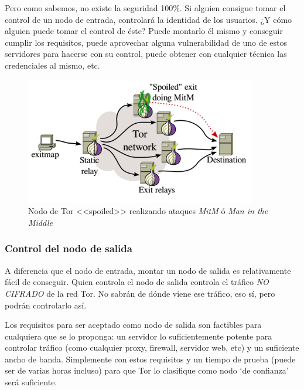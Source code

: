 \documentclass[a4paper, 11pt, titlepage]{article}
\begin{document}
        Pero como sabemos, no existe la seguridad 100\%. Si alguien consigue tomar el control de un nodo de entrada, 
        controlará la identidad de los usuarios. ¿Y cómo alguien puede tomar el control de éste? Puede montarlo él mismo 
        y conseguir cumplir los requisitos, puede aprovechar alguna vulnerabilidad de uno de estos servidores para hacerse 
        con su control, puede obtener con cualquier técnica las credenciales al mismo, etc.

        \begin{figure}[htp]
            \centering
            \includegraphics[width=0.9\textwidth]{resources/torspoiled.png}
            \caption{Nodo de Tor <<spoiled>> realizando ataques \emph{MitM} ó \emph{Man in the Middle}}
            \label{}
        \end{figure}
            
        \subsubsection{Control del nodo de salida}

            A diferencia que el nodo de entrada, montar un nodo de salida es relativamente fácil de conseguir. Quien 
            controla el nodo de salida controla el tráfico \emph{NO CIFRADO} de la red Tor. No sabrán de dónde viene 
            ese tráfico, eso sí, pero podrán controlarlo así.

            Los requisitos para ser aceptado como nodo de salida son factibles para cualquiera que se lo proponga: un 
            servidor lo suficientemente potente para controlar tráfico (como cualquier proxy, firewall, servidor web, 
            etc) y un suficiente ancho de banda. Simplemente con estos requisitos y un tiempo de prueba (puede ser de 
            varias horas incluso) para que Tor lo clasifique como nodo ‘de confianza’ será suficiente.
           
\end{document}
